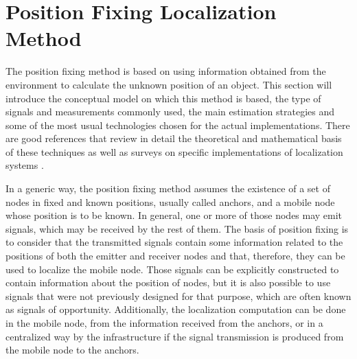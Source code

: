 \section{Position Fixing Localization Method}
\label{sec:2_2_positionFix}
The position fixing method is based on using information obtained from the environment to calculate the unknown position of an object.
This section will introduce the conceptual model on which this method is based, the type of signals and measurements commonly used, the main estimation strategies and some of the most usual technologies chosen for the actual implementations.
There are good references that review in detail the theoretical and mathematical basis of these techniques \cite{gustafsson_mobile_2005, seco_survey_2009, zekavat_handbook_2012, dardari_indoor_2015} as well as surveys on specific implementations of localization systems \cite{mautz_rainer_indoor_2012, ferreira_localization_2017, davidson_survey_2017, brena_evolution_2017}.

In a generic way, the position fixing method assumes the existence of a set of nodes in fixed and known positions, usually called anchors, and a mobile node whose position is to be known.
In general, one or more of those nodes may emit signals, which may be received by the rest of them.
The basis of position fixing is to consider that the transmitted signals contain some information related to the positions of both the emitter and receiver nodes and that, therefore, they can be used to localize the mobile node.
Those signals can be explicitly constructed to contain information about the position of nodes, but it is also possible to use signals that were not previously designed for that purpose, which are often known as signals of opportunity.
Additionally, the localization computation can be done in the mobile node, from the information received from the anchors, or in a centralized way by the infrastructure if the signal transmission is produced from the mobile node to the anchors.


